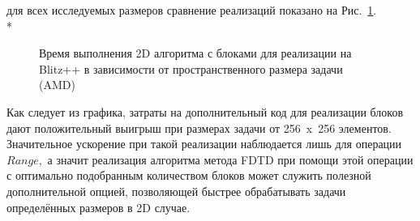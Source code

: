 \documentclass[10pt]{article}
\begin{document}
для всех исследуемых размеров сравнение реализаций показано на 
Рис.~\ref{2D_blocks_amd}.\\*
\begin{figure}[h]
\begin{minipage}[h]{1\textwidth}
\end{minipage}
\caption{Время выполнения 2D алгоритма с блоками для реализации на Blitz++
  в зависимости от пространственного размера задачи (AMD)}
\label{2D_blocks_amd}
\end{figure}
Как следует из графика, затраты на дополнительный код для реализации блоков дают
положительный выигрыш при размерах задачи от 256~x~256 элементов. Значительное
ускорение при такой реализации наблюдается лишь для операции $Range,$ а значит
реализация алгоритма метода FDTD при помощи этой операции с оптимально 
подобранным количеством блоков может служить полезной дополнительной опцией,
позволяющей быстрее обрабатывать задачи определённых размеров в 2D случае.
\newpage
\end{document}
